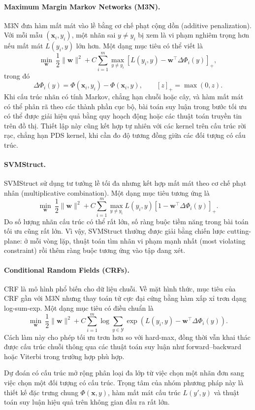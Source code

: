\paragraph{Maximum Margin Markov Networks (M3N).}
M3N đưa hàm mất mát vào lề bằng cơ chế phạt cộng dồn (additive penalization). Với mỗi mẫu $(\bm{x}_i,y_i)$, một nhãn sai $y\neq y_i$ bị xem là vi phạm nghiêm trọng hơn nếu mất mát $L(y_i,y)$ lớn hơn. Một dạng mục tiêu có thể viết là
\[
  \min_{\bm{w}}\ \frac{1}{2}\|\bm{w}\|^2
  + C\sum_{i=1}^{m}\max_{y\neq y_i}
  \left[ L(y_i,y)-\bm{w}^{\top}\Delta\Phi_i(y) \right]_+,
\]
trong đó
\[
  \Delta\Phi_i(y)=\Phi(\bm{x}_i,y_i)-\Phi(\bm{x}_i,y),
  \qquad [z]_+=\max(0,z).
\]
Khi cấu trúc nhãn có tính Markov, chẳng hạn chuỗi hoặc cây, và hàm mất mát có thể phân rã theo các thành phần cục bộ, bài toán suy luận trong bước tối ưu có thể được giải hiệu quả bằng quy hoạch động hoặc các thuật toán truyền tin trên đồ thị. Thiết lập này cũng kết hợp tự nhiên với các kernel trên cấu trúc rời rạc, chẳng hạn PDS kernel, khi cần đo độ tương đồng giữa các đối tượng có cấu trúc.

\paragraph{SVMStruct.}
SVMStruct sử dụng tư tưởng lề tối đa nhưng kết hợp mất mát theo cơ chế phạt nhân (multiplicative combination). Một dạng mục tiêu tương ứng là
\[
  \min_{\bm{w}}\ \frac{1}{2}\|\bm{w}\|^2
  + C\sum_{i=1}^{m}\max_{y\neq y_i}
  L(y_i,y)\left[1-\bm{w}^{\top}\Delta\Phi_i(y)\right]_+.
\]
Do số lượng nhãn cấu trúc có thể rất lớn, số ràng buộc tiềm năng trong bài toán tối ưu cũng rất lớn. Vì vậy, SVMStruct thường được giải bằng chiến lược cutting-plane: ở mỗi vòng lặp, thuật toán tìm nhãn vi phạm mạnh nhất (most violating constraint) rồi thêm ràng buộc tương ứng vào tập đang xét.

\paragraph{Conditional Random Fields (CRFs).}
CRF là mô hình phổ biến cho dữ liệu chuỗi. Về mặt hình thức, mục tiêu của CRF gần với M3N nhưng thay toán tử cực đại cứng bằng hàm xấp xỉ trơn dạng log-sum-exp. Một dạng mục tiêu có điều chuẩn là
\[
  \min_{\bm{w}}\ \frac{1}{2}\|\bm{w}\|^2
  + C\sum_{i=1}^{m}\log\sum_{y\in\mathcal{Y}}
  \exp\left( L(y_i,y)-\bm{w}^{\top}\Delta\Phi_i(y) \right).
\]
Cách làm này cho phép tối ưu trơn hơn so với hard-max, đồng thời vẫn khai thác được cấu trúc chuỗi thông qua các thuật toán suy luận như forward--backward hoặc Viterbi trong trường hợp phù hợp.

\begin{notebox}
Dự đoán có cấu trúc mở rộng phân loại đa lớp từ việc chọn một nhãn đơn sang việc chọn một đối tượng có cấu trúc. Trọng tâm của nhóm phương pháp này là thiết kế đặc trưng chung $\Phi(\bm{x},y)$, hàm mất mát cấu trúc $L(y',y)$ và thuật toán suy luận hiệu quả trên không gian đầu ra rất lớn.
\end{notebox}